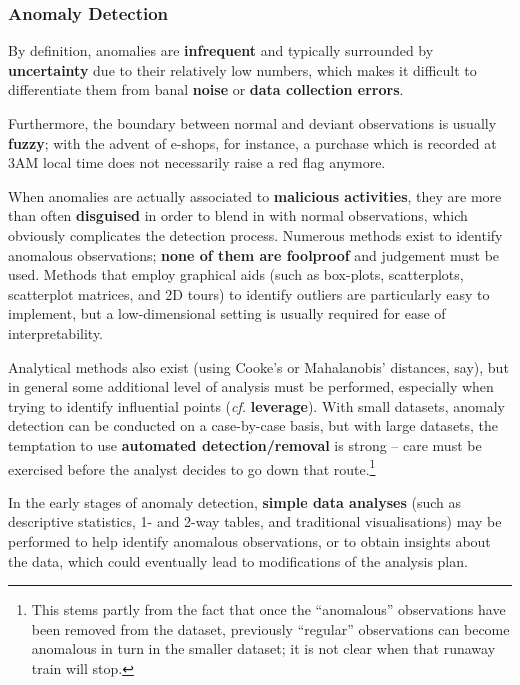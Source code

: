 \subsubsection*{Anomaly Detection}
By definition, anomalies are \textbf{infrequent} and typically surrounded by \textbf{uncertainty} due to their relatively low numbers, which makes it difficult to differentiate them from banal \textbf{noise} or \textbf{data collection errors}. \par Furthermore, the boundary between normal and deviant observations is usually \textbf{fuzzy}; with the advent of e-shops, for instance, a purchase which is recorded at 3AM local time does not necessarily raise a red flag anymore. \par When anomalies are actually associated to \textbf{malicious activities}, they are more than often \textbf{disguised} in order to blend in with normal observations, which obviously complicates the detection process.
\newl
Numerous methods exist to identify anomalous observations; \textbf{none of them are foolproof} and judgement must be used. Methods that employ graphical aids (such as box-plots, scatterplots, scatterplot matrices, and 2D tours) to identify outliers are particularly easy to implement, but a low-dimensional setting is usually required for ease of interpretability. \par Analytical methods also exist (using Cooke's or Mahalanobis' distances, say), but in general some additional level of analysis must be performed, especially when trying to identify influential points (\textit{cf.} \textbf{leverage}). 
\newl With small datasets, anomaly detection can be conducted on a case-by-case basis, but with large datasets, the temptation to use \textbf{automated detection/removal} is strong -- care must be exercised before the analyst decides to go down that route.\footnote{This stems partly from the fact that once the ``anomalous'' observations have been removed from the dataset, previously ``regular'' observations can become anomalous in turn in the smaller dataset; it is not clear when that runaway train will stop.}\par
In the early stages of anomaly detection, \textbf{simple data analyses} (such as descriptive statistics, 1- and 2-way tables, and  traditional visualisations) may be performed to help identify anomalous observations, or to obtain insights about the data, which could eventually lead to modifications of the analysis plan.
